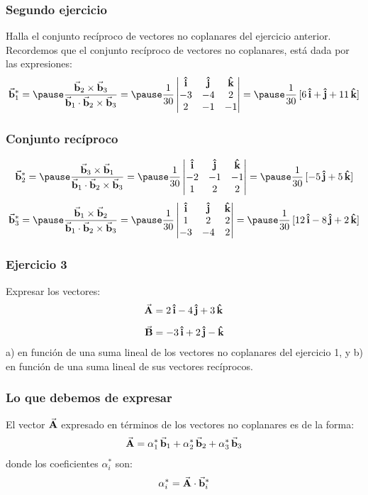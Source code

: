 \documentclass[12pt]{beamer}
\begin{document}
\begin{frame}
\frametitle{Segundo ejercicio}
Halla el conjunto recíproco de vectores no coplanares del ejercicio anterior.
\\
\bigskip
\pause
Recordemos que el conjunto recíproco de vectores no coplanares, está dada por las expresiones:
\begin{eqnarray*}
\va{b}_{1}^{*} = \pause \dfrac{\va{b}_{2} \times \va{b}_{3}}{\va{b}_{1} \cdot \va{b}_{2} \times \va{b}_{3}} = \pause
\dfrac{1}{30} \, \mqty|
\vu{i} & \vu{j} & \vu{k} \\
-3 & -4 & 2 \\
2 & -1 & -1| = \pause \dfrac{1}{30} \, [6 \, \vu{i} + \vu{j} + 11 \, \vu{k}]
\end{eqnarray*}
\end{frame}
\begin{frame}
\frametitle{Conjunto recíproco}
\vspace*{-1.5cm}
\begin{eqnarray*}
\va{b}_{2}^{*} = \pause \dfrac{\va{b}_{3} \times \va{b}_{1}}{\va{b}_{1} \cdot \va{b}_{2} \times \va{b}_{3}} = \pause
\dfrac{1}{30} \, \mqty|
\vu{i} & \vu{j} & \vu{k} \\
-2 & -1 & -1 \\
1 & 2 & 2| = \pause \dfrac{1}{30} \, [- 5 \, \vu{j} + 5 \, \vu{k}]
\end{eqnarray*}
\pause
\begin{eqnarray*}
\va{b}_{3}^{*} = \pause \dfrac{\va{b}_{1} \times \va{b}_{2}}{\va{b}_{1} \cdot \va{b}_{2} \times \va{b}_{3}} = \pause
\dfrac{1}{30} \, \mqty|
\vu{i} & \vu{j} & \vu{k} \\
1 & 2 & 2 \\
-3 & -4 & 2| = \pause \dfrac{1}{30} \, [12 \, \vu{i} - 8 \, \vu{j} + 2 \, \vu{k}]
\end{eqnarray*}
\end{frame}
\begin{frame}
\frametitle{Ejercicio 3}
Expresar los vectores:
\begin{align*}
\va{A} &= 2 \, \vu{i} - 4 \, \vu{j} + 3 \, \vu{k} \\[0.5em]
\va{B} &= -3 \, \vu{i} +2 \, \vu{j} - \vu{k}
\end{align*}
\pause
a) en función de una suma lineal de los vectores no coplanares del ejercicio 1, y b) en función de una suma lineal de sus vectores recíprocos.
\end{frame}
\begin{frame}
\frametitle{Lo que debemos de expresar}
El vector $\va{A}$ expresado en términos de los vectores no coplanares es de la forma:
\begin{align*}
\va{A} = \alpha_{1}^{*} \, \va{b}_{1} + \alpha_{2}^{*} \, \va{b}_{2} + \alpha_{3}^{*} \, \va{b}_{3}
\end{align*}
\pause
donde los coeficientes $\alpha_{i}^{*}$ son:
\pause
\begin{align*}
\alpha_{i}^{*} = \va{A} \cdot \va{b}_{i}^{*}
\end{align*}
\end{frame}
\end{document}
